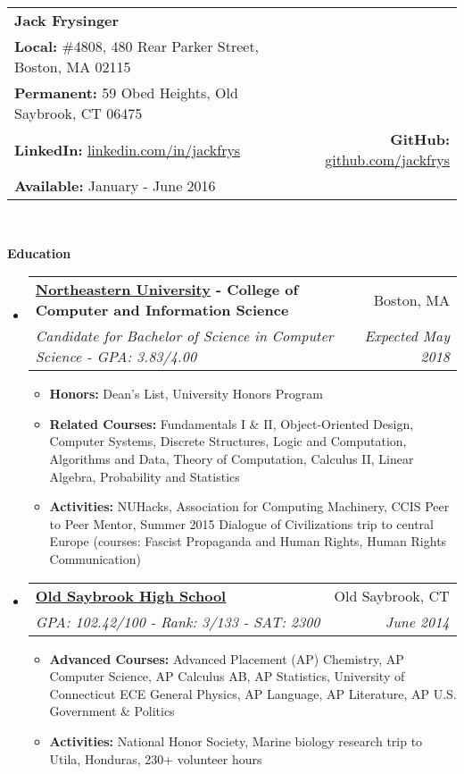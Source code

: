 \documentclass[letterpaper,10.6pt]{article}
\makeatletter
\newcommand{\resitem}[1]{\item #1 \vspace{-2pt}}
\newcommand{\resheading}[1]{{\large \colorbox{mygrey}{\begin{minipage}{\textwidth}{\textbf{#1 \vphantom{p\^{E}}}}\end{minipage}}}}
\newcommand{\ressubheading}[4]{
\begin{tabular*}{6.8in}{l@{\extracolsep{\fill}}r}
		\textbf{#1} & #2 \\
		\emph{#3} & \emph{#4} \\
\end{tabular*}\vspace{-6pt}}
\makeatother
\begin{document}
\newcommand{\mywebheader}{
\begin{tabular*}{7in}{l@{\extracolsep{\fill}}r}
	\textbf{\LARGE Jack Frysinger} &
	\\
	\textbf{Local:} \#4808, 480 Rear Parker Street, Boston, MA 02115 &
	\\\textbf{Permanent:} 59 Obed Heights, Old Saybrook, CT 06475 &
	\\
	\textbf{LinkedIn:} \href{http://linkedin.com/in/jackfrys}{linkedin.com/in/jackfrys} & \textbf{GitHub:} \href{https://github.com/jackfrys}{github.com/jackfrys}
	\\
	\textbf{Available:} January - June 2016
	\end{tabular*}
\\
\vspace{0.1in}}

\mywebheader

\resheading{Education}
	\begin{itemize}[leftmargin=*]
		\item[]
			\ressubheading{\href{http://www.northeastern.edu}{Northeastern University} - College of Computer and Information Science}{Boston, MA}{{Candidate for Bachelor of Science in Computer Science - }{GPA: 3.83/4.00}}{Expected May 2018}
				{ \footnotesize
				\begin{itemize}
					\resitem{\textbf{Honors:} Dean's List, University Honors Program}
					\resitem{\textbf{Related Courses:} Fundamentals I \& II, Object-Oriented Design, Computer Systems, Discrete Structures, Logic and Computation, Algorithms and Data, Theory of Computation, Calculus II, Linear Algebra, Probability and Statistics}
					\resitem{\textbf{Activities:} NUHacks, Association for Computing Machinery, CCIS Peer to Peer Mentor, Summer 2015 Dialogue of Civilizations trip to central Europe (courses: Fascist Propaganda and Human Rights, Human Rights Communication)}
				\end{itemize}}
		\item[]
			\ressubheading{\href{http://www.oldsaybrookschools.org/page.cfm?p=605}{Old Saybrook High School}}{Old Saybrook, CT}{{GPA: 102.42/100 - Rank: 3/133 - SAT: 2300}}{June 2014}
			{\footnotesize
			\begin{itemize}
				\resitem{\textbf{Advanced Courses:} Advanced Placement (AP) Chemistry, AP Computer Science, AP Calculus AB, AP Statistics, University of Connecticut ECE General Physics, AP Language, AP Literature, AP U.S. Government \& Politics}
				\resitem{\textbf{Activities:} National Honor Society, Marine biology research trip to Utila, Honduras, 230+ volunteer hours}
			\end{itemize}}
	\end{itemize} %
	
\end{document}
